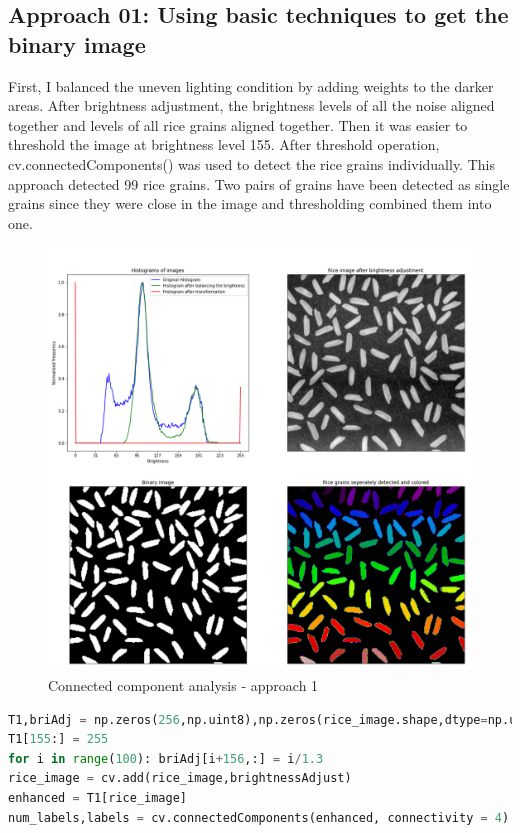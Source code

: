 \documentclass[11pt, a4paper]{article}
\begin{document}
\subsection{Approach 01: Using basic techniques to get the binary image}
\begin{minipage}{.4\textwidth}
First, I balanced the uneven lighting condition by adding weights to the darker areas. After brightness adjustment, the brightness levels of all the noise aligned together and levels of all rice grains aligned together. Then it was easier to threshold the image at brightness level 155. After threshold operation, cv.connectedComponents() was used to detect the rice grains individually. This approach detected 99 rice grains. Two pairs of grains have been detected as single grains since they were close in the image and thresholding combined them into one.
\end{minipage}
\hfill
\begin{minipage}{.6\textwidth}
\begin{figure}[H]
	\centering
	\includegraphics[width=\textwidth]{./Outputs/Rice1.png}
	\caption{Connected component analysis - approach 1}
	\label{fig:CCA image1}
\end{figure}
\end{minipage}

\begin{lstlisting}[language=python]
T1,briAdj = np.zeros(256,np.uint8),np.zeros(rice_image.shape,dtype=np.uint8)
T1[155:] = 255
for i in range(100): briAdj[i+156,:] = i/1.3
rice_image = cv.add(rice_image,brightnessAdjust)
enhanced = T1[rice_image]
num_labels,labels = cv.connectedComponents(enhanced, connectivity = 4)
\end{lstlisting}
\end{document}

